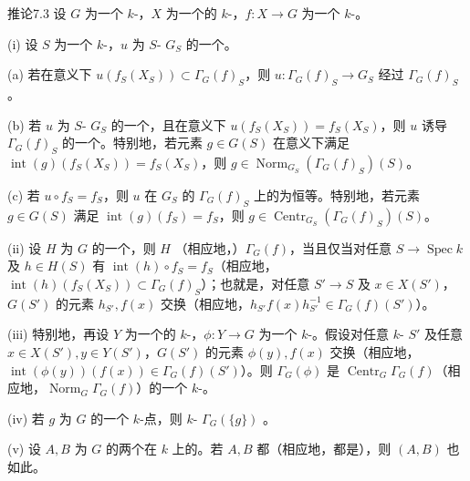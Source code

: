 \begin{SGAresult}{推论}{7.3}
设 $G$ 为一个 $k$-，$X$ 为一个的 $k$-，$f:X\to G$ 为一个 $k$-。

(i) 设 $S$ 为一个 $k$-，$u$ 为 $S$- $G_S$ 的一个。

(a) 若在意义下 $u(f_S(X_S))\subset\Gamma_G(f)_S$，则 $u:\Gamma_G(f)_S\to G_S$ 经过 $\Gamma_G(f)_S$ 。

(b) 若 $u$ 为 $S$- $G_S$ 的一个，且在意义下 $u(f_S(X_S))=f_S(X_S)$，则 $u$ 诱导 $\Gamma_G(f)_S$ 的一个。特别地，若元素 $g\in G(S)$ 在意义下满足 $\operatorname{int}(g)(f_S(X_S))=f_S(X_S)$，则 $g\in\operatorname{Norm}_{G_S}(\Gamma_G(f)_S)(S)$。

(c) 若 $u\circ f_S=f_S$，则 $u$ 在 $G_S$ 的 $\Gamma_G(f)_S$ 上的为恒等。特别地，若元素 $g\in G(S)$ 满足 $\operatorname{int}(g)(f_S)=f_S$，则 $g\in\operatorname{Centr}_{G_S}(\Gamma_G(f)_S)(S)$。

(ii) 设 $H$ 为 $G$ 的一个，则 $H$ （相应地，）$\Gamma_G(f)$，当且仅当对任意 $S\to\operatorname{Spec}k$ 及 $h\in H(S)$ 有 $\operatorname{int}(h)\circ f_S=f_S$（相应地，$\operatorname{int}(h)(f_S(X_S))\subset\Gamma_G(f)_S$）；也就是，对任意 $S'\to S$ 及 $x\in X(S')$，$G(S')$ 的元素 $h_{S'},f(x)$ 交换（相应地，$h_{S'}f(x)h_{S'}^{-1}\in\Gamma_G(f)(S')$）。

(iii) 特别地，再设 $Y$ 为一个的 $k$-，$\phi:Y\to G$ 为一个 $k$-。假设对任意 $k$- $S'$ 及任意 $x\in X(S'),y\in Y(S')$，$G(S')$ 的元素 $\phi(y),f(x)$ 交换（相应地，$\operatorname{int}(\phi(y))(f(x))\in\Gamma_G(f)(S')$）。则 $\Gamma_G(\phi)$ 是 $\operatorname{Centr}_G\Gamma_G(f)$（相应地，$\operatorname{Norm}_G\Gamma_G(f)$）的一个 $k$-。

(iv) 若 $g$ 为 $G$ 的一个 $k$-点，则 $k$- $\Gamma_G(\{g\})$ 。

(v) 设 $A,B$ 为 $G$ 的两个在 $k$ 上的。若 $A,B$ 都（相应地，都是），则 $(A,B)$ 也如此。
\end{SGAresult}
